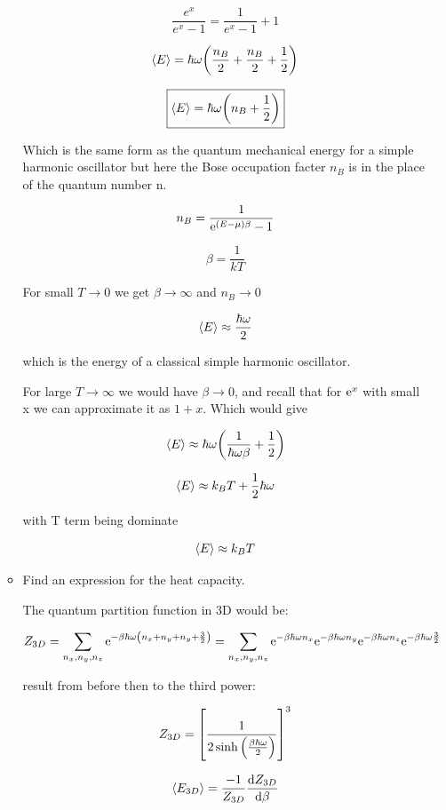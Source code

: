 \begin{enumerate}[label=(\alph*)]
\begin{itemize}
        \[ \frac{e^x}{e^x -1} = \frac{1}{e^x - 1} + 1 \]

        \[ \avg{E} = \hbar \omega \paren*{\frac{n_B}{2} + \frac{n_B}{2} + \frac{1}{2}} \]
        
        \[\boxed{ \avg{E} = \hbar \omega \paren*{ n_B + \frac{1}{2}}}\]

        Which is the same form as the quantum mechanical energy for a simple harmonic oscillator but here the Bose occupation facter $n_B$ is in the place of the quantum number n.

        \[ n_B = \recip{\e^{(E-\mu) \beta} -1}\]

        \[ \beta = \frac{1}{kT}\]

        For small $T \rightarrow 0$ we get $\beta \rightarrow \infty$ and $n_B \rightarrow 0$

        \[ \avg{E} \approx \frac{\hbar \omega }{2}\]

        which is the energy of a classical simple harmonic oscillator.

        For large $T \rightarrow \infty$ we would have $\beta \rightarrow 0 $, and recall that for $\e^x$ with small x we can approximate it as $1+x$. Which would give

        \[ \avg{E} \approx \hbar \omega \paren*{\frac{1}{\hbar \omega \beta} + \frac{1}{2}}\]

        \[ \avg{E} \approx k_B T + \frac{1}{2} \hbar \omega \]

        with T term being dominate

        \[ \avg{E} \approx k_B T\]
        
        \item Find an expression for the heat capacity.
        
        \divider

        The quantum partition function in 3D would be:

        \[
        Z_{3D} = \sum_{n_x, n_y, n_z} \e^{-\beta \hbar \omega \paren*{n_x +n_y + n_y + \frac{3}{2}}} = \sum_{n_x, n_y, n_z} \e^{-\beta \hbar \omega n_x} \e^{-\beta \hbar \omega n_y} \e^{-\beta \hbar \omega n_z} \e^{-\beta \hbar \omega \frac{3}{2}}
        \]

        result from before then to the third power:

        \[ Z_{3D} = \brackets*{\frac{1}{2 \sinh{\paren*{\frac{\beta \hbar \omega}{2}}}}}^3 \]

        \[ \avg{E_{3D}} = \frac{-1}{Z_{3D}} \dv{Z_{3D}}{\beta} \]


\end{itemize}
\end{enumerate}
